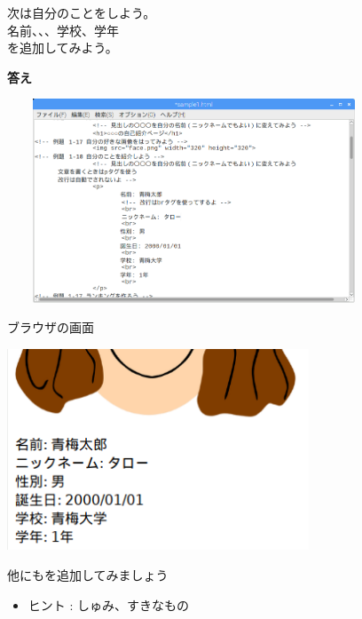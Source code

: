 \documentclass[a4paper,12pt]{jarticle}
\begin{document}
\bigskip

次は自分のことをしよう。\\
名前、、、学校、学年\\
を追加してみよう。



\bigskip

\bigskip


\textbf{答え}


\bigskip

\includegraphics[width=11.151cm,height=6.066cm]{textbook-img177.png}



\bigskip

\bigskip



ブラウザの画面

\includegraphics[width=9cm,height=6cm]{textbook-img173.png}



\clearpage
{}\theQuestion\label{Q:hasAnswer04-4}

他にもを追加してみましょう

\begin{itemize}
  \item ヒント : しゅみ、すきなもの
\end{itemize}
\theQuestion\label{Q:hasAnswer04-5}
\end{document}
